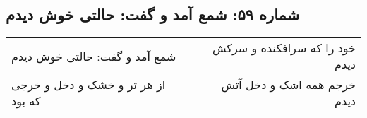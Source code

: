 \begin{center}
\section*{شماره ۵۹: شمع آمد و گفت: حالتی خوش دیدم}
\label{sec:059}
\begin{longtable}{l p{0.5cm} r}
شمع آمد و گفت: حالتی خوش دیدم
&&
خود را که سرافکنده و سرکش دیدم
\\
از هر تر و خشک و دخل و خرجی که بود
&&
خرجم همه اشک و دخل آتش دیدم
\\
\end{longtable}
\end{center}
